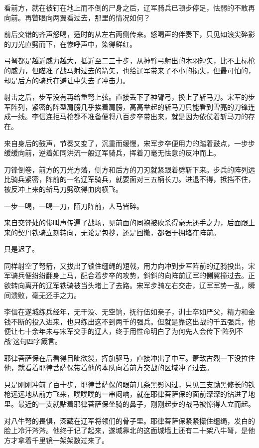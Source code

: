 看前方，就在被钉在地上而不倒的尸身之后，辽军骑兵已顿步停足，怯弱的不敢再向前。再瞥眼向两翼看过去，那里的情况如何？

前后交错的齐声怒喝，适时的从左右两侧传来。怒喝声的伴奏下，只见如浪尖碎影的刀光直劈而下，在惨呼声中，染得鲜红。

弓弩都是越近威力越大，抵近至二三十步，从神臂弓射出的木羽短矢，比不上标枪的威力，但瞄准了战马射过去的箭矢，也给辽军带来了不小的损失，但最可怕的，却是后方的骑兵在避让中失去了冲击力。

射击之后，步军没有再给重弩上弦。直接丢下了神臂弓，换上了斩马刀。宋军的步军阵列，紧密的阵型肩膀几乎挨着肩膀，高高举起的斩马刀只能看到雪亮的刀锋连成一线。李信连拒马枪都不准备便将八百步卒带出来，就是因为依仗着斩马刀的存在。

来自身后的鼓声，节奏又变了，沉重而缓慢，宋军步卒便用力的踏着鼓点，一步步缓缓向前，逆着如同洪流一般辽军骑兵，挥着刀毫无怯意的反冲而上。

刀锋倒卷，前方的刀光方落，侧方和后方的刀刃就紧跟着劈斩下来。步兵的阵列远比骑兵紧密，阵前的一名辽军骑兵，就要面对三五柄长刀。进退不得，抵挡不住，被反冲上来的斩马刀劈砍得血肉横飞。

一步一喝，一喝一刀，陌刀阵前，人马皆碎。

来自交锋处的惨叫声传遍了战场，见前面的同袍被砍杀得毫无还手之力，后面跟上来的契丹铁骑立刻转向，无论是包抄，还是回撤，都强于拥堵在阵前。

只是迟了。

同样射空了弩箭，又拔出了锁住缰绳的短戟，用力向冲到步军阵前的辽骑投出，宋军骑兵便纷纷翻身上马，配合着步卒的攻势，斜斜的向阵前辽军的侧翼撞过去。正欲转向离开的辽军铁骑被当头堵上了去路。宋军步骑左右交击，辽军军势一乱，瞬间溃败，毫无还手之力。

李信在遂城练兵经年，无干没、无空饷，抚行伍如亲子，训士卒如严父，精力和金钱不断的投入进来，也只练出这不到两千的强兵。但就是靠这出战的千五强兵，他便让七十余年未与宋军交手的辽人，终于用性命明白了为何先人会传下‘阵列不战’这句四字箴言。

耶律菩萨保在后看得目眦欲裂，挥旗驱马，直接冲出了中军。萧敌古烈一下没拉住他，就看着耶律菩萨保带着他的本队向着前方交战的区域冲了过去。

只是刚刚冲前了百十步，耶律菩萨保的眼前几条黑影闪过，只见三支黝黑修长的铁枪远远地从前方飞来，噗噗噗的一串闷响，就在耶律菩萨保的面前深深的钻进了地里。最近的一支就贴着耶律菩萨保坐骑的鼻子，刚刚起步的战马被惊得人立而起。

对八牛弩的畏惧，深藏在辽军将领们的骨子里。耶律菩萨保紧紧攥住缰绳，发白的脸上冷汗涔涔。他终于记了起来，遂城靠北的这面城墙上还有二十架八牛弩，是他方才拿着千里镜一架架数过来了。

